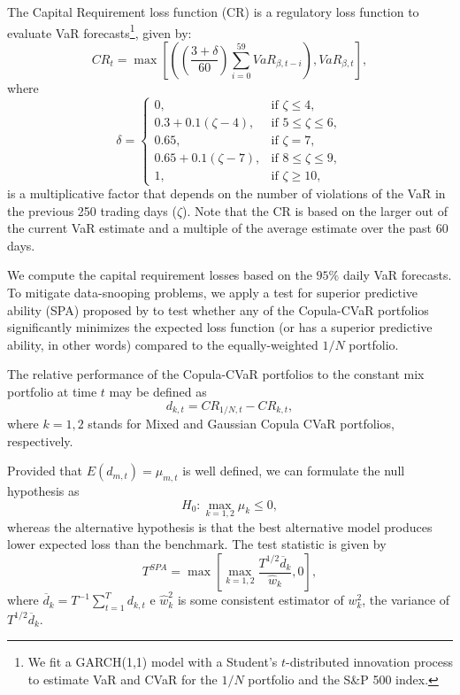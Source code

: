 \documentclass[a4paper,10pt]{article}
\begin{document}
The Capital Requirement loss function (CR) is a regulatory loss function to evaluate VaR forecasts\footnote{We fit a GARCH(1,1) model with a Student's $t$-distributed innovation process to estimate VaR and CVaR for the $1/N$ portfolio and the S\&P 500 index.}, given by:
\begin{equation}CR_{t} =\max \left [\left (\genfrac{(}{)}{}{}{3 +\delta }{60}\sum _{i =0}^{59}VaR_{\beta  ,t -i}\right ) ,VaR_{\beta  ,t}\right ] ,
\end{equation} 
where
\begin{equation*}
\delta  = \begin{cases}
0,& \text{if }\zeta \leq 4, \\ 
0.3+0.1\left( \zeta -4\right),& \text{if }5\leq \zeta \leq 6, \\ 
0.65,& \text{if }\zeta =7, \\ 
0.65+0.1\left( \zeta -7\right),&\text{if }8\leq \zeta \leq 9, \\ 
1,&\text{if }\zeta \geq 10,
\end{cases}
\end{equation*}
is a multiplicative factor that depends on the number of violations of the VaR in the previous 250 trading days ($\zeta$). Note that the CR is based on the larger out of the current VaR estimate and a multiple of the average estimate over the past 60 days.

We compute the capital requirement losses based on the $95\%$ daily VaR forecasts. To mitigate data-snooping problems, we apply a test for superior predictive ability (SPA) proposed by \citet*{hansen2005test} to test whether any of the Copula-CVaR portfolios significantly minimizes the expected loss function (or has a superior predictive ability, in other words) compared to the equally-weighted $1/N$ portfolio. 

The relative performance of the Copula-CVaR portfolios to the constant mix portfolio at time $t$ may be defined as 
\[d_{k,t}=CR_{1/N,t}-CR_{k,t},\]%
where $k = 1, 2$ stands for Mixed and Gaussian Copula CVaR portfolios, respectively. 

Provided that $E\left( d_{m,t}\right) =\mu _{m,t}$ is well defined, we can formulate the null hypothesis as 
\[H_{0}:\underset{k=1,2}{\max }\mu _{k}\leq 0,\]
whereas the alternative hypothesis is that the best alternative model produces lower expected loss than the benchmark. The test statistic is given by 
\[T^{SPA}=\max \left[\underset{k=1,2}{\max } \frac{T^{1/2}\overline{d}_{k}}{\widehat{w}_{k}},0\right] ,
\]
where $\overline{d}_{k}=T^{-1}\sum_{t=1}^{T}d_{k,t}$ e $\widehat{w}_{k}^{2}$ is some consistent estimator of $w_{k}^{2}$, the variance of $T^{1/2}\overline{d}_{k}$. 
\end{document}
